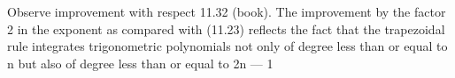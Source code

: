 Observe improvement with respect 11.32 (book).
The improvement
by the factor 2 in the exponent as compared with (11.23) reflects the fact
that the trapezoidal rule integrates trigonometric polynomials not only of
degree less than or equal to n but also of degree less than or equal to 2n — 1
